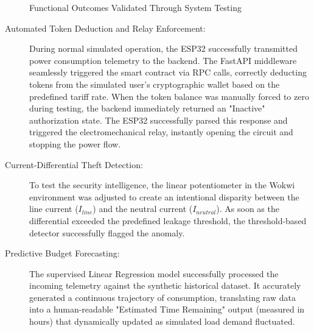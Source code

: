 \begin{figure}[H]
\centering
{}
\caption{Functional Outcomes Validated Through System Testing}
\label{fig:functional-outcomes}
\end{figure}

\begin{description}

    \item[Automated Token Deduction and Relay Enforcement:]

    During normal simulated operation, the ESP32 successfully transmitted power consumption telemetry to the backend. The FastAPI middleware seamlessly triggered the smart contract via RPC calls, correctly deducting tokens from the simulated user's cryptographic wallet based on the predefined tariff rate. When the token balance was manually forced to zero during testing, the backend immediately returned an "Inactive" authorization state. The ESP32 successfully parsed this response and triggered the electromechanical relay, instantly opening the circuit and stopping the power flow.

    \item[Current-Differential Theft Detection:]

    To test the security intelligence, the linear potentiometer in the Wokwi environment was adjusted to create an intentional disparity between the line current ($I_{line}$) and the neutral current ($I_{neutral}$). As soon as the differential exceeded the predefined leakage threshold, the threshold-based detector successfully flagged the anomaly.

    \item[Predictive Budget Forecasting:]

    The supervised Linear Regression model successfully processed the incoming telemetry against the synthetic historical dataset. It accurately generated a continuous trajectory of consumption, translating raw data into a human-readable "Estimated Time Remaining" output (measured in hours) that dynamically updated as simulated load demand fluctuated.

\end{description}

